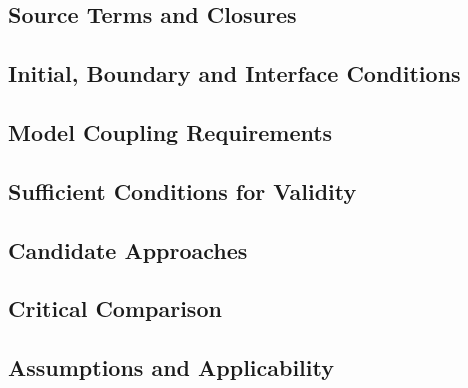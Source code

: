 \subsection{Source Terms and Closures}
\label{sec:res-mod-eqs-source-terms-closures}


\subsection{Initial, Boundary and Interface Conditions}
\label{sec:res-mod-eqs-initial-boundary-interface-conditions}


\subsection{Model Coupling Requirements}
\label{sec:res-mod-eqs-model-coupling-requirements}


\subsection{Sufficient Conditions for Validity}
\label{sec:res-mod-eqs-sufficient-conditions-validity}


\subsection{Candidate Approaches}
\label{sec:res-mod-eqs-candidate-approaches}


\subsection{Critical Comparison}
\label{sec:res-mod-eqs-critical-comparison}


\subsection{Assumptions and Applicability}
\label{sec:res-mod-eqs-assumptions}

